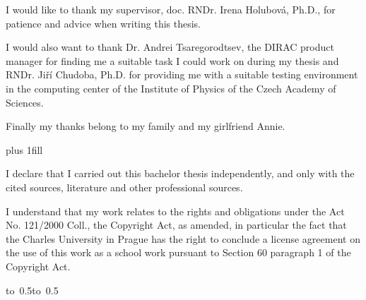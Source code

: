 \documentclass[12pt,a4paper]{report}
\let\openright=\clearpage
\begin{document}
\newpage



\openright

\noindent
I would like to thank my supervisor, doc. RNDr. Irena Holubová, Ph.D., for patience and advice when
writing this thesis. 

I would also want to thank Dr. Andrei Tsaregorodtsev, the DIRAC product manager for finding me a suitable
task I could work on during my thesis and RNDr. Jiří Chudoba, Ph.D. for providing me with a suitable testing
environment in the computing center of the Institute of Physics of the Czech Academy of Sciences.

Finally my thanks belong to my family and my girlfriend Annie.

\newpage


\vglue 0pt plus 1fill

\noindent
I declare that I carried out this bachelor thesis independently, and only with the cited
sources, literature and other professional sources.

\medskip\noindent
I understand that my work relates to the rights and obligations under the Act No.
121/2000 Coll., the Copyright Act, as amended, in particular the fact that the Charles
University in Prague has the right to conclude a license agreement on the use of this
work as a school work pursuant to Section 60 paragraph 1 of the Copyright Act.

\vspace{10mm}

\hbox{\hbox to 0.5\hbox to 0.5}

\vspace{20mm}
\newpage

\end{document}
